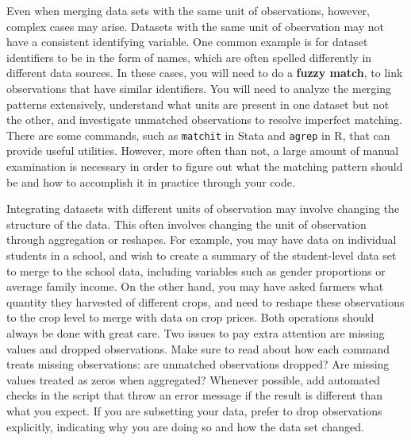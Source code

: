 Even when merging data sets with the same unit of observations, however,
complex cases may arise.
Datasets with the same unit of observation may not have a consistent identifying variable.
One common example is for dataset identifiers to be in the form of names,
which are often spelled differently in different data sources.
In these cases, you will need to do a \textbf{fuzzy match},
to link observations that have similar identifiers.
You will need to analyze the merging patterns extensively,
understand what units are present in one dataset but not the other,
and investigate unmatched observations to resolve imperfect matching.
There are some commands, such as \texttt{matchit} in Stata
and \texttt{agrep} in R,
that can provide useful utilities.
However, more often than not, a large amount of manual examination is necessary
in order to figure out what the matching pattern should be
and how to accomplish it in practice through your code.

Integrating datasets with different units of observation may involve changing the structure of the data.
This often involves changing the unit of observation through aggregation or reshapes.
For example, you may have data on individual students in a school,
and wish to create a summary of the student-level data set to merge to the school data,
including variables such as gender proportions or average family income.
On the other hand, you may have asked farmers what quantity they harvested of different crops,
and need to reshape these observations to the crop level to merge with data on crop prices.
Both operations should always be done with great care.
Two issues to pay extra attention are missing values and dropped observations.
Make sure to read about how each command treats missing observations:
are unmatched observations dropped? Are missing values treated as zeros when aggregated?
Whenever possible, add automated checks in the script that throw an error message
if the result is different than what you expect.
If you are subsetting your data, prefer to drop observations explicitly,
indicating why you are doing so and how the data set changed.

